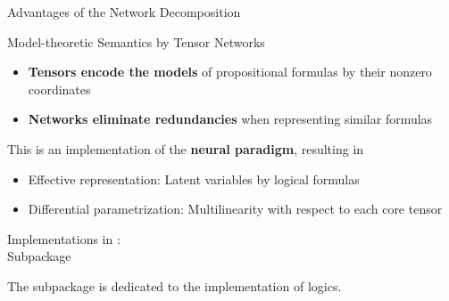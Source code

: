 \documentclass{beamer}
\begin{document}
\begin{frame}{Advantages of the Network Decomposition}

	\begin{block}{Model-theoretic Semantics by Tensor Networks}
		\begin{itemize}	
			\item \textbf{Tensors encode the models} of propositional formulas by their nonzero coordinates
			\item \textbf{Networks eliminate redundancies} when representing similar formulas
		\end{itemize}
	\end{block}

\medskip 

This is an implementation of the \textbf{neural paradigm}, resulting in
\begin{itemize}
	\item Effective representation: Latent variables by logical formulas
	\item Differential parametrization: Multilinearity with respect to each core tensor
\end{itemize}

\end{frame}


\begin{frame}{Implementations in \tnreason: \\
Subpackage \sprepresentation{}}

The subpackage \sprepresentation{} is dedicated to the implementation of logics.

\begin{center}
\end{center}

\end{frame}
\end{document}
